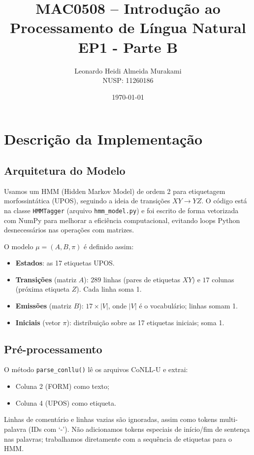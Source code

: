 \documentclass[12pt,a4paper]{article}
\title{\textbf{MAC0508 -- Introdução ao Processamento de Língua Natural}\\
\Large{EP1 - Parte B}}
\author{Leonardo Heidi Almeida Murakami \\ NUSP: 11260186}
\date{\today}
\begin{document}
\maketitle

\section{Descrição da Implementação}

\subsection{Arquitetura do Modelo}

Usamos um HMM (Hidden Markov Model) de ordem 2 para etiquetagem morfossintática (UPOS), seguindo a ideia de transições \(XY \to YZ\). O código está na classe \texttt{HMMTagger} (arquivo \texttt{hmm\_model.py}) e foi escrito de forma vetorizada com NumPy para melhorar a eficiência computacional, evitando loops Python desnecessários nas operações com matrizes.

O modelo \(\mu = (A, B, \pi)\) é definido assim:
\begin{itemize}
    \item \textbf{Estados}: as 17 etiquetas UPOS.
    \item \textbf{Transições} (matriz \(A\)): \(289\) linhas (pares de etiquetas \(XY\)) e \(17\) colunas (próxima etiqueta \(Z\)). Cada linha soma 1.
    \item \textbf{Emissões} (matriz \(B\)): \(17 \times |V|\), onde \(|V|\) é o vocabulário; linhas somam 1.
    \item \textbf{Iniciais} (vetor \(\pi\)): distribuição sobre as 17 etiquetas iniciais; soma 1.
\end{itemize}

\subsection{Pré-processamento}

O método \texttt{parse\_conllu()} lê os arquivos CoNLL-U e extrai:
\begin{itemize}
    \item Coluna 2 (FORM) como texto;
    \item Coluna 4 (UPOS) como etiqueta.
\end{itemize}
Linhas de comentário e linhas vazias são ignoradas, assim como tokens multi-palavra (IDs com `-'). Não adicionamos tokens especiais de início/fim de sentença nas palavras; trabalhamos diretamente com a sequência de etiquetas para o HMM.
\end{document}

